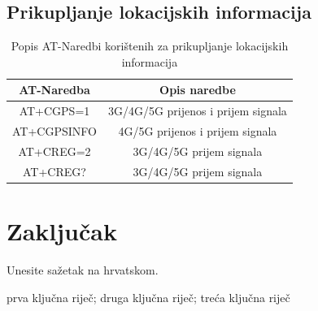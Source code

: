\documentclass[zavrsnirad]{fer}
\begin{document}
\section{Prikupljanje lokacijskih informacija}
\label{dio:lokacijska_informacija}

\begin{table}[h!]
  \centering
  \begin{tabular}{|c|c|}
      \hline
      \textbf{AT-Naredba} & \textbf{Opis naredbe} \\
      \hline
      AT+CGPS=1 & 3G/4G/5G prijenos i prijem signala \\
      \hline
      AT+CGPSINFO & 4G/5G prijenos i prijem signala \\
      \hline
      AT+CREG=2 & 3G/4G/5G prijem signala \\
      \hline
      AT+CREG? & 3G/4G/5G prijem signala \\
      \hline
  \end{tabular}
  \caption{Popis AT-Naredbi korištenih za prikupljanje lokacijskih informacija}
  \label{tab:at_naredbe_lokacija}
\end{table}



\chapter{Zaključak}
\label{pog:zakljucak}

\blindtext








\begin{sazetak}
  Unesite sažetak na hrvatskom.

  \blindtext
\end{sazetak}

\begin{kljucnerijeci}
  prva ključna riječ; druga ključna riječ; treća ključna riječ
\end{kljucnerijeci}
\end{document}
